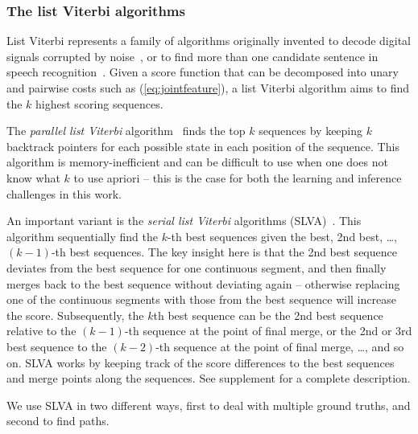 
\subsubsection{The list Viterbi algorithms}
List Viterbi represents a family of algorithms originally invented to decode digital signals corrupted by noise~\cite{seshadri1994list,nill1995list}, or to find more than one candidate sentence in speech recognition~\cite{soong1991tree}. Given a score function that can be decomposed into unary and pairwise costs such as (\ref{eq:jointfeature}), a list Viterbi algorithm aims to find the $k$ highest scoring sequences. %

The \emph{parallel list Viterbi} algorithm~\cite{seshadri1994list} finds the top $k$ sequences
by keeping $k$ backtrack pointers for each possible state in each position of the sequence.
This algorithm is memory-inefficient and can be difficult to use when one does not know what $k$ to use apriori -- this is the case for both the learning and inference challenges in this work.

An important variant is the \emph{serial list Viterbi} algorithms (SLVA)~\cite{seshadri1994list,nill1995list,nilsson2001sequentially}.
This algorithm sequentially find the $k$-th best sequences given the best, 2nd best, \dots, $(k \!-\! 1)$-th best sequences.
The key insight here is that the 2nd best sequence deviates from the best sequence
for one continuous segment, and then finally merges back to the best sequence without deviating again
-- otherwise replacing one of the continuous segments with those from the best sequence will increase the score.
Subsequently, the $k$th best sequence can be the 2nd best sequence relative to the $(k \!-\! 1)$-th sequence
at the point of final merge, or the 2nd or 3rd best sequence to the $(k \!-\! 2)$-th sequence at the point of final merge, \ldots, and so on. SLVA works by keeping track of the score differences to the best sequences and merge points along the sequences. See supplement for a complete description.


We use SLVA in two different ways, first to deal with multiple ground truths, and second
to find paths.

